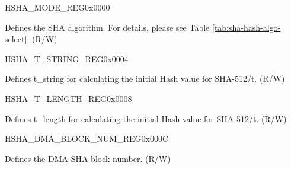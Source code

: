 \begin{register}{H}{SHA\_MODE\_REG}{0x{}0000}\label{regdesc:SHAMODEREG}
%
%
\regnewline%
\begin{regdesc}\begin{reglist}
\label{fielddesc:SHAMODE}\item [SHA\_MODE] Defines the SHA algorithm. For details, please see Table \ref{tab:sha-hash-algo-select}. (R/W)
\end{reglist}\end{regdesc}
\end{register}


\begin{register}{H}{SHA\_T\_STRING\_REG}{0x{}0004}\label{regdesc:SHATSTRINGREG}
%
\regnewline%
\begin{regdesc}\begin{reglist}
\label{fielddesc:SHATSTRING}\item [SHA\_T\_STRING] Defines t\_string for calculating the initial Hash value for SHA-512/t. (R/W)
\end{reglist}\end{regdesc}
\end{register}


\begin{register}{H}{SHA\_T\_LENGTH\_REG}{0x{}0008}\label{regdesc:SHATLENGTHREG}
%
%
\regnewline%
\begin{regdesc}\begin{reglist}
\label{fielddesc:SHATLENGTH}\item [SHA\_T\_LENGTH] Defines t\_length for calculating the initial Hash value for SHA-512/t. (R/W)
\end{reglist}\end{regdesc}
\end{register}


\begin{register}{H}{SHA\_DMA\_BLOCK\_NUM\_REG}{0x{}000C}\label{regdesc:SHADMABLOCKNUMREG}
%
%
\regnewline%
\begin{regdesc}\begin{reglist}
\label{fielddesc:SHADMABLOCKNUM}\item [SHA\_DMA\_BLOCK\_NUM] Defines the DMA-SHA block number. (R/W)
\end{reglist}\end{regdesc}
\end{register}

